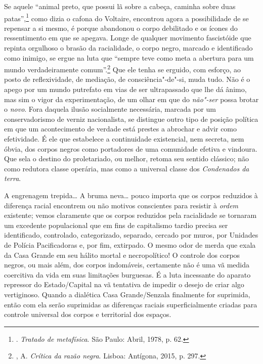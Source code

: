Se aquele ``animal preto, que possui lã sobre a cabeça, caminha sobre
duas patas'',\footnote{. \emph{Tratado de metafísica}. São Paulo:
  Abril, 1978, p. 62.} como dizia o cafona do Voltaire, encontrou agora
a possibilidade de se repensar a si mesmo, é porque abandonou o corpo
debilitado e os ícones do ressentimento em que se apegava. Longe de
qualquer movimento fascistóide que repinta orgulhoso o brasão da
racialidade, o corpo negro, marcado e identificado como inimigo, se
ergue na luta que ``sempre teve
como meta a abertura para um mundo verdadeiramente comum''.\footnote{,
  A. \emph{Crítica da razão negra}. Lisboa: Antígona, 2015, p. 297.}
Que ele tenha se erguido, com esforço, ao posto de reflexividade, de
mediação, de consciência"-de"-si, muda tudo. Não é o apego por um mundo
putrefato em vias de ser ultrapassado que lhe dá ânimo, mas sim o vigor
da experimentação, de um olhar em que do \emph{não"-ser} possa brotar o
\emph{novo}. Fora daquela ilusão socialmente necessária, marcada por um
conservadorismo de verniz nacionalista, se distingue outro tipo de
posição política em que um acontecimento de verdade está prestes a
abrochar e advir como efetividade. É ele que estabelece a continuidade
existencial, nem secreta, nem óbvia, dos corpos negros como portadores
de uma comunidade efetiva e vindoura. Que sela o destino do
proletariado, ou melhor, retoma seu sentido clássico; não como redutora
classe operária, mas como a universal classe dos \emph{Condenados da
terra}.

A engrenagem trepida\ldots{} A bruma
neva\ldots{} pouco importa que os corpos reduzidos à diferença racial
encontrem ou não motivos conscientes para resistir à \emph{ordem}
existente; vemos claramente que os corpos reduzidos pela racialidade se
tornaram um excedente populacional que em fins de capitalismo tardio
precisa ser identificado, controlado, categorizado, separado, cercado
por muros, por Unidades de Polícia Pacificadoras e, por fim, extirpado.
O mesmo odor de merda que exala da Casa Grande em seu hálito mortal e
necropolítico! O controle dos corpos negros, ou mais além, dos corpos
indomáveis, certamente não é uma vã medida coercitiva da vida em suas
limitações burguesas. É a luta incessante do aparato repressor do
Estado/Capital na vã tentativa de impedir o desejo de criar algo
vertiginoso. Quando a dialética Casa Grande/Senzala finalmente for
suprimida, então com ela serão suprimidas as diferenças raciais
superficialmente criadas para controle universal dos corpos e
territorial dos espaços.

